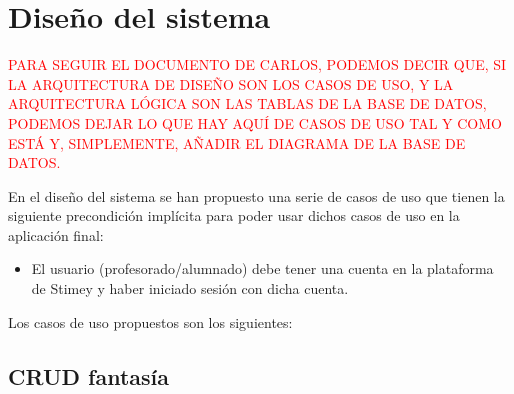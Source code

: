 \chapter{Diseño del sistema}

\textcolor{red}{PARA SEGUIR EL DOCUMENTO DE CARLOS, PODEMOS DECIR QUE, SI LA ARQUITECTURA DE DISEÑO SON LOS CASOS DE USO, Y LA ARQUITECTURA LÓGICA SON LAS TABLAS DE LA BASE DE DATOS, PODEMOS DEJAR LO QUE  HAY AQUÍ DE CASOS DE USO TAL Y COMO ESTÁ Y, SIMPLEMENTE, AÑADIR EL DIAGRAMA DE LA BASE DE DATOS.}

En el diseño del sistema se han propuesto una serie de casos de uso que tienen la siguiente precondición implícita para poder usar dichos casos de uso en la aplicación final:
\begin{itemize}
	\item El usuario (profesorado/alumnado) debe tener una cuenta en la plataforma de Stimey y haber iniciado sesión con dicha cuenta.
\end{itemize}

Los casos de uso propuestos son los siguientes:

\section{CRUD fantasía}
\hypertarget{crearfantasia}{}
